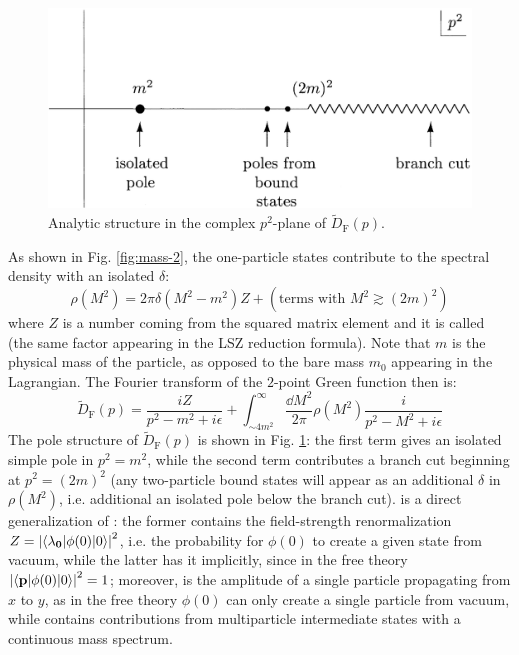 \begin{figure}[!ht]
  \centering
  \includegraphics[width = 0.60 \textwidth]{images/poles.png}
  \caption{Analytic structure in the complex $ p^2 $-plane of $ \tilde{D}_\text{F}(p) $.}
  \label{fig:mass-3}
\end{figure}

As shown in Fig. \ref{fig:mass-2}, the one-particle states contribute to the spectral density with an isolated $ \delta $:
\begin{equation}
  \rho(M^2) = 2\pi \delta(M^2 - m^2) Z + (\text{terms with } M^2 \gtrsim (2m)^2)
\end{equation}
where $ Z $ is a number coming from the squared matrix element and it is called  (the same factor appearing in the LSZ reduction formula). Note that $ m $ is the physical mass of the particle, as opposed to the bare mass $ m_0 $ appearing in the Lagrangian. The Fourier transform of the $ 2 $-point Green function then is:
\begin{equation}
  \tilde{D}_\text{F}(p) = \frac{i Z}{p^2 - m^2 + i\epsilon} + \int_{\sim 4m^2}^\infty \frac{\dd M^2}{2\pi} \rho(M^2) \frac{i}{p^2 - M^2 + i\epsilon}
  \label{eq:corr-func-gen}
\end{equation}
The pole structure of $ \tilde{D}_\text{F}(p) $ is shown in Fig. \ref{fig:mass-3}: the first term gives an isolated simple pole in $ p^2 = m^2 $, while the second term contributes a branch cut beginning at $ p^2 = (2m)^2 $ (any two-particle bound states will appear as an additional $ \delta $ in $ \rho(M^2) $, i.e. additional an isolated pole below the branch cut).  is a direct generalization of : the former contains the field-strength renormalization $ Z = \left\lvert\braket{\lambda_{\mathbf{0}} | \phi(0) | 0}\right\rvert^2 $, i.e. the probability for $ \phi(0) $ to create a given state from vacuum, while the latter has it implicitly, since in the free theory $ \left\lvert\braket{\mathbf{p} | \phi(0) | 0}\right\rvert^2 = 1 $; moreover,  is the amplitude of a single particle propagating from $ x $ to $ y $, as in the free theory $ \phi(0) $ can only create a single particle from vacuum, while  contains contributions from multiparticle intermediate states with a continuous mass spectrum.

